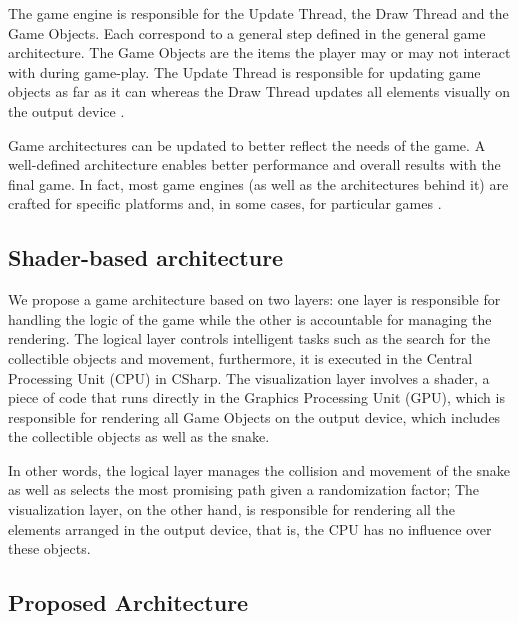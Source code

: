\documentclass[runningheads]{llncs}
\begin{document}
The game engine is responsible for the Update Thread, the Draw Thread and the Game Objects. Each correspond to a general step defined in the general game architecture. The Game Objects are the items the player may or may not interact with during game-play. The Update Thread  is responsible for updating game objects as far as it can whereas the Draw Thread updates all elements visually on the output device \cite{portales}.

Game architectures can be updated to better reflect the needs of the game. A well-defined architecture enables better performance and overall results with the final game. In fact, most game engines (as well as the architectures behind it) are crafted for specific platforms and, in some cases, for particular games \cite{gregory_2019}. 

\subsection{Shader-based architecture}
 \label{subsec:shader-architecture}


We propose a game architecture based on two layers: one layer is responsible for handling the logic of the game while the other is accountable for managing the rendering.  The logical layer controls intelligent tasks such as the search for the collectible objects and movement, furthermore, it is executed in the Central Processing Unit (CPU) in CSharp. The visualization layer involves a shader, a piece of code that runs directly in the Graphics Processing Unit (GPU), which is responsible for rendering all Game Objects on the output device, which includes the collectible objects as well as the snake.

In other words, the logical layer manages the collision and movement of the snake as well as selects the most promising path given a randomization factor; The visualization layer, on the other hand, is responsible for rendering all the elements arranged in the output device, that is, the CPU has no influence over these objects.

\subsection{Proposed Architecture}

\end{document}
